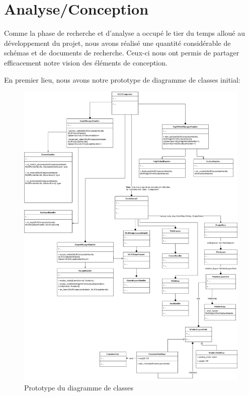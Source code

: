 \documentclass[titlepage]{article}
\begin{document}
\section{Analyse/Conception}
\par
Comme la phase de recherche et d'analyse a occupé le tier du temps alloué au développement du projet, nous avons réalisé une quantité considérable de schémas et de documents de recherche. Ceux-ci nous ont permis de partager efficacement notre vision des éléments de conception.
\bigskip

\par
En premier lieu, nous avons notre prototype de diagramme de classes initial:
\bigskip

\begin{figure}[H]
	\centering
	\includegraphics[width=\textwidth]{Diagramme_de_classes.jpg}
	\caption{Prototype du diagramme de classes}
\end{figure}
\end{document}
